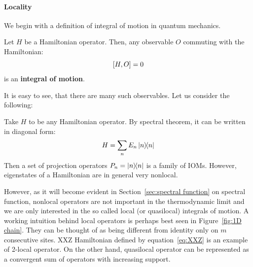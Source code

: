 \paragraph{Locality} We begin with a definition of integral of motion in quantum mechanics.
\begin{definition}
  Let \(H\) be a Hamiltonian operator. Then, any observable \(O\) commuting with the Hamiltonian:
  \begin{equation*}
    \comm{H}{O} = 0
  \end{equation*}
  is an \textbf{integral of motion}.\label{def:iom}
\end{definition}
It is easy to see, that there are many such observables. Let us consider the following:
\begin{example}
  Take \(H\) to be any Hamiltonian operator. By spectral theorem, it can be written in diagonal form:
  \begin{equation*}
    H = \sum_n E_n \ketbra{n}{n}
  \end{equation*}
  Then a set of projection operators \(P_n = \ketbra{n}{n}\) is a family of IOMs.
  However, eigenstates of a Hamiltonian are in general very nonlocal.\label{ex: projectors}
\end{example}
However, as it will become evident in Section~\ref{sec:spectral function} on spectral function, nonlocal operators are not important in the
thermodynamic limit and we are only interested in the so called local (or quasilocal) integrals of motion.
A working intuition behind local operators is perhaps best seen in Figure~\ref{fig:1D chain}. They can be thought of as
being different from identity only on \(m\) consecutive sites. XXZ Hamiltonian defined by equation~\eqref{eq:XXZ} is an
example of 2-local operator. On the other hand, quasilocal operator can be represented as a convergent sum of operators
with increasing support.
